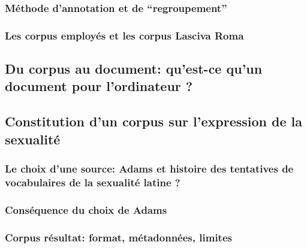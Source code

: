 \subsubsection{Méthode d’annotation et de “regroupement”}


\subsubsection{Les corpus employés et les corpus Lasciva Roma}


\subsection{Du corpus au document: qu’est-ce qu’un document pour l’ordinateur ?}


\subsection{Constitution d’un corpus sur l’expression de la sexualité}

\subsubsection{Le choix d’une source: Adams et histoire des tentatives de vocabulaires de la sexualité latine ?}


\subsubsection{Conséquence du choix de Adams}



\subsubsection{Corpus résultat: format, métadonnées, limites}

